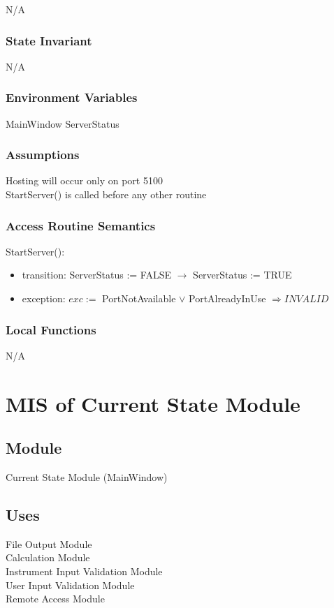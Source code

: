 \documentclass[12pt, titlepage]{article}
\begin{document}
N/A

\subsubsection{State Invariant}

N/A

\subsubsection{Environment Variables}
MainWindow
ServerStatus 

\subsubsection{Assumptions}
Hosting will occur only on port 5100 \\
StartServer() is called before any other routine

\subsubsection{Access Routine Semantics}
\noindent StartServer():
\begin{itemize}
\item transition: ServerStatus := FALSE $\rightarrow$ ServerStatus := TRUE
\item exception: $exc:=$ PortNotAvailable $\lor$ PortAlreadyInUse  $\Rightarrow INVALID$
\end{itemize}

\subsubsection{Local Functions}

N/A

\newpage
\section{MIS of Current State Module} \label{CS} 

\subsection{Module}

Current State Module (MainWindow)

\subsection{Uses}
File Output Module \\
Calculation Module \\
Instrument Input Validation Module \\
User Input Validation Module \\
Remote Access Module \\
\end{document}
